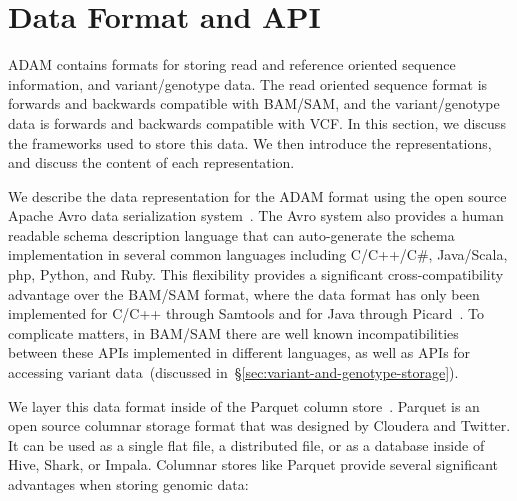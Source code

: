 \documentclass[10pt,twocolumn]{article}
\theoremstyle{plain}
\begin{document}
\section{Data Format and API}
\label{sec:data-format-and-api}

ADAM contains formats for storing read and reference oriented sequence information, and variant/genotype data.
The read oriented sequence format is forwards and backwards compatible with BAM/SAM, and the variant/genotype
data is forwards and backwards compatible with VCF. In this section, we discuss the frameworks used to store this
data. We then introduce the representations, and discuss the content of each representation.

We describe the data representation for the ADAM format using the open source Apache Avro data serialization
system~\cite{avro}. The Avro system also provides a human readable schema description language that can
auto-generate the schema implementation in several common languages including  C/C++/C\#, Java/Scala, php,
Python, and Ruby. This flexibility provides a significant cross-compatibility advantage over the BAM/SAM format,
where the data format has only been implemented for C/C++ through Samtools and for Java through
Picard~\cite{li09,picard}. To complicate matters, in BAM/SAM there are well known incompatibilities between these APIs implemented in different languages,
as well as APIs for accessing variant data~(discussed in~\S\ref{sec:variant-and-genotype-storage}).

We layer this data format inside of the Parquet column store~\cite{parquet}. Parquet is an open source columnar storage
format that was designed by Cloudera and Twitter. It can be used as a single flat file, a distributed file, or as a database inside of Hive, Shark, or Impala. Columnar stores like Parquet provide several significant advantages when storing genomic data:
\end{document}
